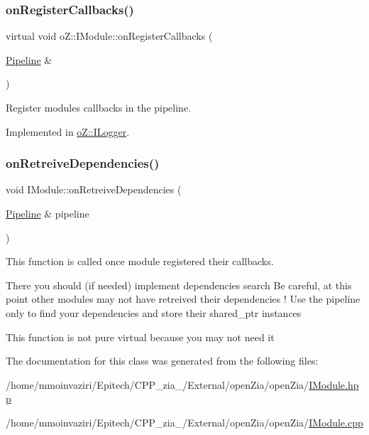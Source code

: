 \subsubsection{\texorpdfstring{onRegisterCallbacks()}{onRegisterCallbacks()}}
{\footnotesize\ttfamily virtual void o\+Z\+::\+I\+Module\+::on\+Register\+Callbacks (\begin{DoxyParamCaption}\item[{\mbox{\hyperlink{classo_z_1_1_pipeline}{Pipeline}} \&}]{ }\end{DoxyParamCaption})\hspace{0.3cm}{\ttfamily [pure virtual]}}



Register module\textquotesingle{}s callbacks in the pipeline. 



Implemented in \mbox{\hyperlink{classo_z_1_1_i_logger_a10732b6da6e8f085c6fe5fa154d361ef}{o\+Z\+::\+I\+Logger}}.

\mbox{\label{classo_z_1_1_i_module_af183d3711ef7d7a6966ac078b63a7685}} 
\subsubsection{\texorpdfstring{onRetreiveDependencies()}{onRetreiveDependencies()}}
{\footnotesize\ttfamily void I\+Module\+::on\+Retreive\+Dependencies (\begin{DoxyParamCaption}\item[{\mbox{\hyperlink{classo_z_1_1_pipeline}{Pipeline}} \&}]{pipeline }\end{DoxyParamCaption})\hspace{0.3cm}{\ttfamily [virtual]}}



This function is called once module registered their callbacks. 

There you should (if needed) implement dependencies search Be careful, at this point other modules may not have retreived their dependencies ! Use the pipeline only to find your dependencies and store their shared\+\_\+ptr instances

This function is not pure virtual because you may not need it 

The documentation for this class was generated from the following files\+:\begin{DoxyCompactItemize}
\item 
/home/mmoinvaziri/\+Epitech/\+C\+P\+P\+\_\+zia\+\_/\+External/open\+Zia/open\+Zia/\mbox{\hyperlink{_i_module_8hpp}{I\+Module.\+hpp}}\item 
/home/mmoinvaziri/\+Epitech/\+C\+P\+P\+\_\+zia\+\_/\+External/open\+Zia/open\+Zia/\mbox{\hyperlink{_i_module_8cpp}{I\+Module.\+cpp}}\end{DoxyCompactItemize}
